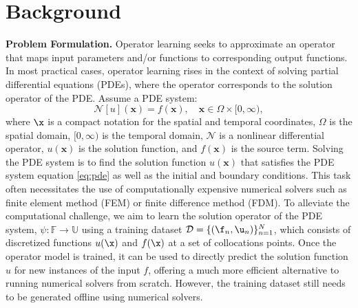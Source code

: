 \section{Background}
\noindent\textbf{Problem Formulation.} Operator learning seeks to approximate an operator that maps input parameters and/or functions to corresponding output functions.  
In most practical cases, operator learning rises in the context of solving partial differential equations (PDEs), where the operator corresponds to the solution operator of the PDE.
Assume a PDE system:
\begin{equation}
	\label{eq:pde}
	\mathcal{N}[u](\mathbf{x}) = f(\mathbf{x}), \quad \mathbf{x} \in \Omega \times [0,\infty), 
\end{equation}
where $\x$ is a compact notation for the spatial and temporal coordinates, $\Omega$ is the spatial domain, $[0,\infty)$ is the temporal domain, $\mathcal{N}$ is a nonlinear differential operator, $u(\mathbf{x})$ is the solution function, and $f(\mathbf{x})$ is the source term. Solving the PDE system is to find the solution function $u(\mathbf{x})$ that satisfies the PDE system equation \eqref{eq:pde} as well as the initial and boundary conditions. This task often necessitates the use of computationally expensive numerical solvers such as finite element method (FEM) or finite difference method (FDM). To alleviate the computational challenge, we aim to learn the solution operator of the PDE system, \({\psi}: \mathbb{F} \rightarrow \mathbb{U}\) using a training dataset \(\mathcal{D} = \{(\f_n,\u_n)\}_{n=1}^N\), which consists of discretized functions $u(\x)$ and $f(\x)$ at a set of collocations points. Once the operator model is trained, it can be used to directly predict the solution function $u$ for new instances of the input $f$,   offering a much more efficient alternative to running numerical solvers from scratch. However, the training dataset still needs to be generated offline using numerical solvers.




